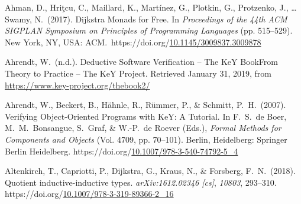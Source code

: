 \documentclass[12pt,twoside]{article}
\begin{document}
{\begin{thebibliography}{222}
Ahman, D., Hriţcu, C., Maillard, K., Martínez, G., Plotkin, G., Protzenko, J., … Swamy, N.~(2017). Dijkstra Monads for Free. In \emph{Proceedings of the 44th ACM SIGPLAN Symposium on Principles of Programming Languages} (pp. 515–529). New York, NY, USA: ACM.~https://doi.org/\href{https://dx.doi.org/10.1145/3009837.3009878}{10.1145/3009837.3009878}\label{ahman_dijkstra_2017}%

\mdbibitemlabel{[Ahrendt, n.d.]}Ahrendt, W.~(n.d.). Deductive Software Verification – The KeY BookFrom Theory to Practice – The KeY Project. Retrieved January 31, 2019, from \href{https://www.key-project.org/thebook2/}{{\ttfamily https://\hspace{0pt}www.\hspace{0pt}key-\hspace{0pt}project.\hspace{0pt}org/\hspace{0pt}thebook2/\hspace{0pt}}}\label{ahrendt_deductive_nodate}%

Ahrendt, W., Beckert, B., Hähnle, R., Rümmer, P., \& Schmitt, P.~H.~(2007). Verifying Object-Oriented Programs with KeY: A Tutorial. In F.~S.~de Boer, M.~M.~Bonsangue, S.~Graf, \& W.-P.~de Roever (Eds.), \emph{Formal Methods for Components and Objects} (Vol. 4709, pp. 70–101). Berlin, Heidelberg: Springer Berlin Heidelberg. https://doi.org/\href{https://dx.doi.org/10.1007/978-3-540-74792-5_4}{10.1007/978-3-540-74792-5\_4}\label{hutchison_verifying_2007}%

Altenkirch, T., Capriotti, P., Dijkstra, G., Kraus, N., \& Forsberg, F.~N.~(2018). Quotient inductive-inductive types. \emph{arXiv:1612.02346 {}[cs]}, \emph{10803}, 293–310. https://doi.org/\href{https://dx.doi.org/10.1007/978-3-319-89366-2_16}{10.1007/978-3-319-89366-2\_16}\label{altenkirch_quotient_2018}%


\end{thebibliography}}
\end{document}
